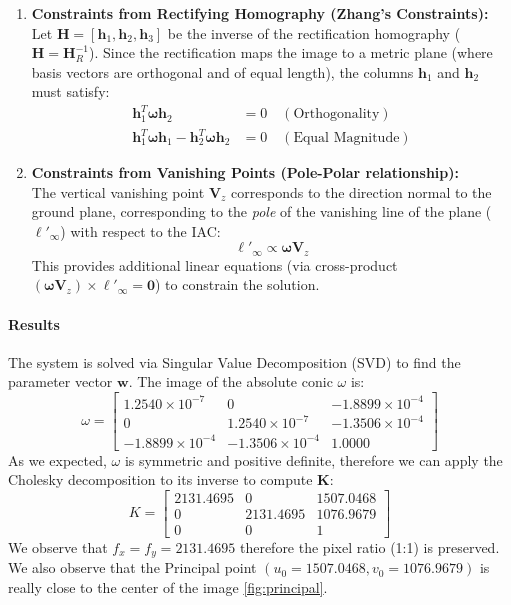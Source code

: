 \documentclass[a4paper,11pt]{article}
\newcommand{\matr}[1]{\bm{#1}}     %
\newcommand{\vect}[1]{\mathbf{#1}}  %
\begin{document}
\begin{enumerate}
    \item \textbf{Constraints from Rectifying Homography (Zhang's Constraints):} \\
    Let $\matr{H} = [\vect{h}_1, \vect{h}_2, \vect{h}_3]$ be the inverse of the rectification homography ($\matr{H} = \matr{H}_R^{-1}$). Since the rectification maps the image to a metric plane (where basis vectors are orthogonal and of equal length), the columns $\vect{h}_1$ and $\vect{h}_2$ must satisfy:
    \begin{align}
        \vect{h}_1^T \matr{\omega} \vect{h}_2 &= 0 \quad (\text{Orthogonality}) \\
        \vect{h}_1^T \matr{\omega} \vect{h}_1 - \vect{h}_2^T \matr{\omega} \vect{h}_2 &= 0 \quad (\text{Equal Magnitude})
    \end{align}

    \item \textbf{Constraints from Vanishing Points (Pole-Polar relationship):} \\
    The vertical vanishing point $\vect{V}_z$ corresponds to the direction normal to the ground plane, corresponding to the \textit{pole} of the vanishing line of the plane ($\vect{\ell}'_\infty$) with respect to the IAC:
    \begin{equation}
        \vect{\ell}'_\infty \propto \matr{\omega} \vect{V}_z
    \end{equation}
    This provides additional linear equations (via cross-product $(\matr{\omega} \vect{V}_z) \times \vect{\ell}'_\infty = \vect{0}$) to constrain the solution.
\end{enumerate}

\paragraph{Results}
The system is solved via Singular Value Decomposition (SVD) to find the parameter vector $\vect{w}$. The image of the absolute conic $\omega$ is:
 \[
   \omega  =
\begin{bmatrix}
1.2540 \times 10^{-7} & 0 & -1.8899 \times 10^{-4} \\
0 & 1.2540 \times 10^{-7} & -1.3506 \times 10^{-4} \\
-1.8899 \times 10^{-4} & -1.3506 \times 10^{-4} & 1.0000
\end{bmatrix}
\]
As we expected, $\omega$ is symmetric and positive definite, therefore we can apply the Cholesky decomposition to its inverse to compute $\mathbf{K}$:
\[
K =
    \begin{bmatrix}
    2131.4695 & 0 & 1507.0468 \\
    0 & 2131.4695 & 1076.9679 \\
    0 & 0 & 1
    \end{bmatrix}
    \]
We observe that $f_x = f_y = 2131.4695$ therefore the pixel ratio (1:1) is preserved. We  also observe that the Principal point $(u_0 = 1507.0468, v_0 = 1076.9679 )$ is really close to the center of the image \ref{fig:principal}.
\end{document}

